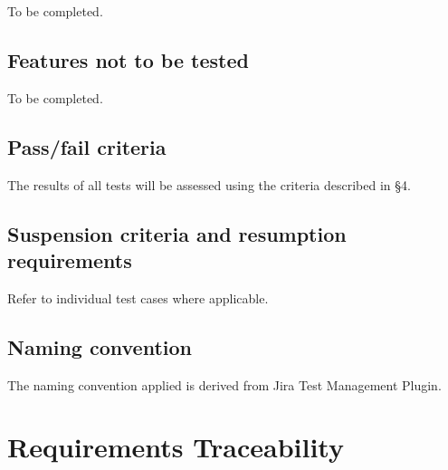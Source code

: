 \documentclass[DM,lsstdraft,STS,toc]{lsstdoc}
\begin{document}
To be completed.

\subsection{Features not to be tested}
\label{sec:featnot2test}

To be completed.

\subsection{Pass/fail criteria}
\label{sec:passfail}

The results of all tests will be assessed using the criteria described in
 \S4.


\subsection{Suspension criteria and resumption requirements}
\label{suspension}

Refer to individual test cases where applicable.

\subsection{Naming convention}

The naming convention applied is derived from Jira Test Management Plugin.

\newpage


\newpage
\appendix
\section{Requirements Traceability}


\end{document}
